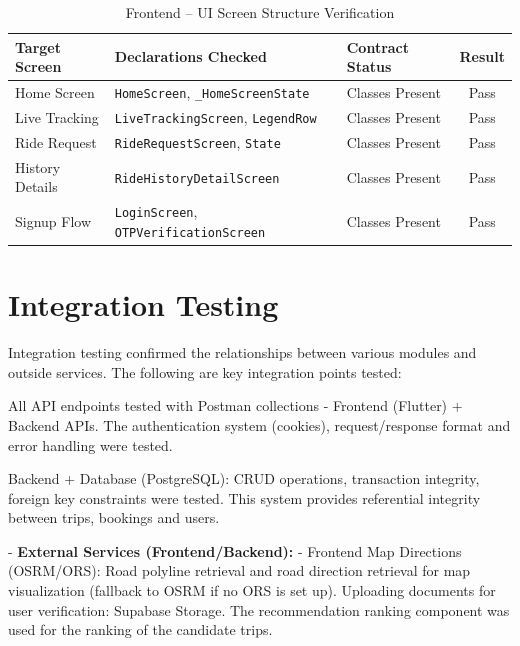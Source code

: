 \begin{table}[H]
\centering
\caption{Frontend – UI Screen Structure Verification}
\renewcommand{\arraystretch}{1.3}
\begin{tabularx}{\textwidth}{|l|X|X|c|}
\hline
\textbf{Target Screen} & \textbf{Declarations Checked} & \textbf{Contract Status} & \textbf{Result} \\
\hline
Home Screen & \texttt{HomeScreen}, \texttt{\_HomeScreenState} & Classes Present & Pass \\
\hline
Live Tracking & \texttt{LiveTrackingScreen}, \texttt{LegendRow} & Classes Present & Pass \\
\hline
Ride Request & \texttt{RideRequestScreen}, \texttt{State} & Classes Present & Pass \\
\hline
History Details & \texttt{RideHistoryDetailScreen} & Classes Present & Pass \\
\hline
Signup Flow & \texttt{LoginScreen}, \texttt{OTPVerificationScreen} & Classes Present & Pass \\
\hline
\end{tabularx}
\end{table}


\section{Integration Testing}

Integration testing confirmed the relationships between various modules and outside services. The following are key integration points tested:

All API endpoints tested with Postman collections - Frontend (Flutter) + Backend APIs. The authentication system (cookies), request/response format and error handling were tested.

Backend + Database (PostgreSQL): CRUD operations, transaction integrity, foreign key constraints were tested. This system provides referential integrity between trips, bookings and users.

- \textbf{External Services (Frontend/Backend):}
  - Frontend Map Directions (OSRM/ORS): Road polyline retrieval and road direction retrieval for map visualization (fallback to OSRM if no ORS is set up).
  Uploading documents for user verification: Supabase Storage.
  The recommendation ranking component was used for the ranking of the candidate trips.

